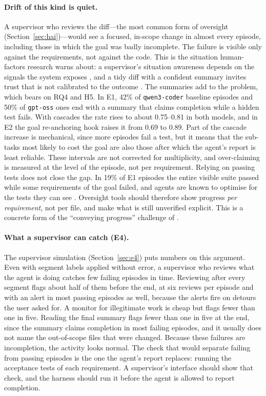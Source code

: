 \paragraph{Drift of this kind is quiet.} A supervisor who reviews the diff---the most common form
of oversight (Section~\ref{sec:hai})---would see a focused, in-scope change in almost every episode,
including those in which the goal was badly incomplete. The failure is visible only against the
requirements, not against the code. This is the situation human-factors research warns about: a
supervisor's situation awareness depends on the signals the system exposes \citep{endsley1995situation},
and a tidy diff with a confident summary invites trust that is not calibrated to the outcome
\citep{lee2004trust}. The summaries add to the problem, which bears on RQ4 and H5. In E1, 42\%
of \texttt{qwen3-coder} baseline episodes and 50\% of \texttt{gpt-oss} ones end with a summary
that claims completion while a hidden test fails. With cascades the rate rises to about 0.75--0.81
in both models, and in E2 the goal re-anchoring hook raises it from 0.69 to 0.89. Part of the
cascade increase is mechanical, since more episodes fail a test, but it means that the sub-tasks
most likely to cost the goal are also those after which the agent's report is least reliable. These
intervals are not corrected for multiplicity, and over-claiming is measured at the level of the
episode, not per requirement. Relying on passing tests does not close the gap. In 19\% of E1 episodes the
entire visible suite passed while some requirements of the goal failed, and agents are known to optimise for the tests they can see
\citep{zhong2025impossiblebench}. Oversight tools should therefore show progress \emph{per
requirement}, not per file, and make what is still unverified explicit. This is a concrete form of
the ``conveying progress'' challenge of \citet{bansal2024communication}.

\paragraph{What a supervisor can catch (E4).} The supervisor simulation (Section~\ref{sec:e4})
puts numbers on this argument. Even with segment labels applied without error, a supervisor who
reviews what the agent is doing catches few failing episodes in time. Reviewing after every segment
flags about half of them before the end, at six reviews per episode and with an alert in most
passing episodes as well, because the alerts fire on detours the user asked for. A monitor for
illegitimate work is cheap but flags fewer than one in five. Reading the final summary flags fewer
than one in five at the end, since the summary claims completion in most failing episodes, and it
usually does not name the out-of-scope files that were changed. Because these failures are
incompletion, the activity looks normal. The check that would separate failing from passing
episodes is the one the agent's report replaces: running the acceptance tests of each requirement.
A supervisor's interface should show that check, and the harness should run it before the agent is
allowed to report completion.

